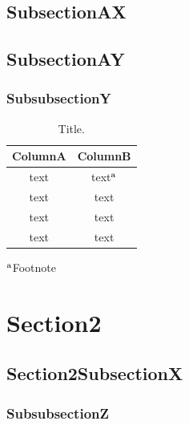 \documentclass[12pt, twoside]{article}
\begin{document}
\subsection{SubsectionAX}\label{ssec:subsectionAX}
\blindtext[5]
\subsection{SubsectionAY}\label{ssec:subsectionAY}
\blindtext[2]
\subsubsection{SubsubsectionY}\label{ssec:subsubsectionY}
\blindtext[2]


\begin{table}[H]
	\centering
	\caption{Title.}
	\small
	\begin{tabular}{cc}
		\hline
		ColumnA & ColumnB \\ \hline
		text & text{\scriptsize $^{\rm a}$} \\
		text & text \\
		text & text \\
		text & text \\
		\hline
	\end{tabular}
	
	{\footnotesize 	{\scriptsize $^{\rm a}$}Footnote}
\end{table}

\section{Section2}\label{ssec:section2}
\blindtext[2]
\subsection{Section2SubsectionX}\label{ssec:section2subsectionx}
\subsubsection{SubsubsectionZ}\label{ssec:subsubsectionZ}
\blindtext[3]
\end{document}

